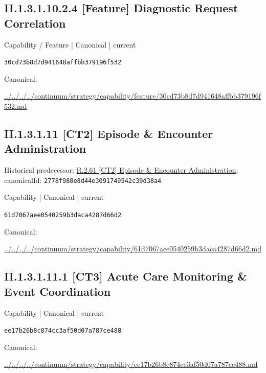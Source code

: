 \documentclass[10pt,a4paper]{article}
\begin{document}
\subsection*{II.1.3.1.10.2.4 [Feature] Diagnostic Request Correlation}
\label{element-30cd73b8d7d941648affbb379196f532}
{\small Capability / Feature | Canonical | current}\par
\texttt{30cd73b8d7d941648affbb379196f532}\par
Canonical: \par
{\footnotesize\url{../../../../continuum/strategy/capability/feature/30cd73b8d7d941648affbb379196f532.md}}\par
\subsection*{II.1.3.1.11 [CT2] Episode \& Encounter Administration}
Historical predecessor: \hyperref[element-2778f988e8d44e3091749542c39d38a4]{R.2.61 [CT2] Episode \& Encounter Administration}; canonicalId: \texttt{2778f988e8d44e3091749542c39d38a4}\par
\label{element-61d7067aee0540259b3daca4287d66d2}
{\small Capability | Canonical | current}\par
\texttt{61d7067aee0540259b3daca4287d66d2}\par
Canonical: \par
{\footnotesize\url{../../../../continuum/strategy/capability/61d7067aee0540259b3daca4287d66d2.md}}\par
\subsection*{II.1.3.1.11.1 [CT3] Acute Care Monitoring \& Event Coordination}
\label{element-ee17b26b8c874cc3af50d07a787ce488}
{\small Capability | Canonical | current}\par
\texttt{ee17b26b8c874cc3af50d07a787ce488}\par
Canonical: \par
{\footnotesize\url{../../../../continuum/strategy/capability/ee17b26b8c874cc3af50d07a787ce488.md}}\par
\end{document}

